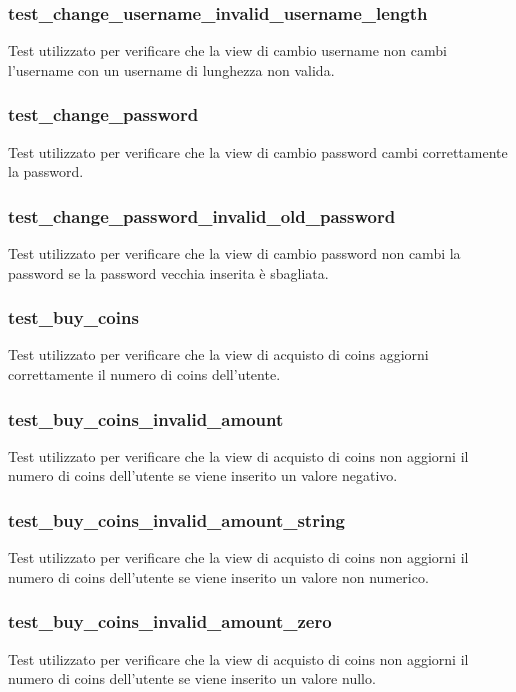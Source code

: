 \subsubsection{test\_change\_username\_invalid\_username\_length}
Test utilizzato per verificare che la view di cambio username non cambi l'username con un username di lunghezza non valida.

\subsubsection{test\_change\_password}
Test utilizzato per verificare che la view di cambio password cambi correttamente la password.

\subsubsection{test\_change\_password\_invalid\_old\_password}
Test utilizzato per verificare che la view di cambio password non cambi la password se la password vecchia inserita è sbagliata.

\subsubsection{test\_buy\_coins}
Test utilizzato per verificare che la view di acquisto di coins aggiorni correttamente il numero di coins dell'utente.

\subsubsection{test\_buy\_coins\_invalid\_amount}
Test utilizzato per verificare che la view di acquisto di coins non aggiorni il numero di coins dell'utente se viene inserito un valore negativo.

\subsubsection{test\_buy\_coins\_invalid\_amount\_string}
Test utilizzato per verificare che la view di acquisto di coins non aggiorni il numero di coins dell'utente se viene inserito un valore non numerico.

\subsubsection{test\_buy\_coins\_invalid\_amount\_zero}
Test utilizzato per verificare che la view di acquisto di coins non aggiorni il numero di coins dell'utente se viene inserito un valore nullo.


